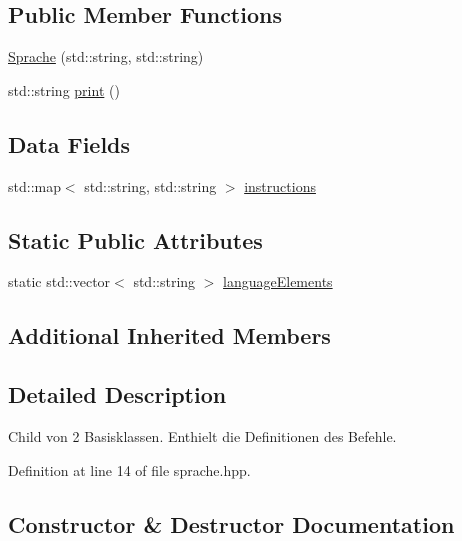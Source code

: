 \subsection*{Public Member Functions}
\begin{DoxyCompactItemize}
\item 
\mbox{\hyperlink{class_sprache_adae8df1e07febd0a493436a0fef2042b}{Sprache}} (std\+::string, std\+::string)
\item 
std\+::string \mbox{\hyperlink{class_sprache_a1e1e39e91e6d33e068fed01333fa99cc}{print}} ()
\end{DoxyCompactItemize}
\subsection*{Data Fields}
\begin{DoxyCompactItemize}
\item 
std\+::map$<$ std\+::string, std\+::string $>$ \mbox{\hyperlink{class_sprache_a6052a9ec0d1202da4b8ff6e6a52e6244}{instructions}}
\end{DoxyCompactItemize}
\subsection*{Static Public Attributes}
\begin{DoxyCompactItemize}
\item 
static std\+::vector$<$ std\+::string $>$ \mbox{\hyperlink{class_sprache_ac0e8018bac279c35c325ad162cb0ba17}{language\+Elements}}
\end{DoxyCompactItemize}
\subsection*{Additional Inherited Members}


\subsection{Detailed Description}
Child von 2 Basisklassen. Enthielt die Definitionen des Befehle. 

Definition at line 14 of file sprache.\+hpp.



\subsection{Constructor \& Destructor Documentation}
\mbox{\label{class_sprache_adae8df1e07febd0a493436a0fef2042b}} 
